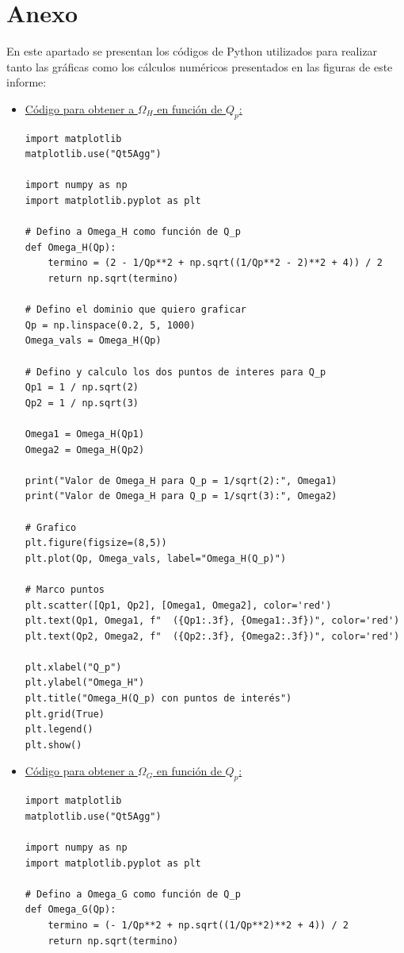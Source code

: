 \documentclass[12pt,a4paper]{article}
\begin{document}
\section{Anexo}
En este apartado se presentan los códigos de Python utilizados para realizar tanto las gráficas como los cálculos numéricos presentados en las figuras de este informe:

\begin{itemize}

\item \underline{Código para obtener a $\Omega_H$ en función de $Q_p$:}
\begin{verbatim}
import matplotlib
matplotlib.use("Qt5Agg")
    
import numpy as np
import matplotlib.pyplot as plt
    
# Defino a Omega_H como función de Q_p
def Omega_H(Qp):
    termino = (2 - 1/Qp**2 + np.sqrt((1/Qp**2 - 2)**2 + 4)) / 2
    return np.sqrt(termino)
    
# Defino el dominio que quiero graficar
Qp = np.linspace(0.2, 5, 1000)
Omega_vals = Omega_H(Qp)
    
# Defino y calculo los dos puntos de interes para Q_p
Qp1 = 1 / np.sqrt(2)
Qp2 = 1 / np.sqrt(3)
    
Omega1 = Omega_H(Qp1)
Omega2 = Omega_H(Qp2)
    
print("Valor de Omega_H para Q_p = 1/sqrt(2):", Omega1)
print("Valor de Omega_H para Q_p = 1/sqrt(3):", Omega2)
    
# Grafico
plt.figure(figsize=(8,5))
plt.plot(Qp, Omega_vals, label="Omega_H(Q_p)")
    
# Marco puntos
plt.scatter([Qp1, Qp2], [Omega1, Omega2], color='red')
plt.text(Qp1, Omega1, f"  ({Qp1:.3f}, {Omega1:.3f})", color='red')
plt.text(Qp2, Omega2, f"  ({Qp2:.3f}, {Omega2:.3f})", color='red')
    
plt.xlabel("Q_p")
plt.ylabel("Omega_H")
plt.title("Omega_H(Q_p) con puntos de interés")
plt.grid(True)
plt.legend()
plt.show()
\end{verbatim}

\item \underline{Código para obtener a $\Omega_G$ en función de $Q_p$:}
\begin{verbatim}
import matplotlib
matplotlib.use("Qt5Agg")
        
import numpy as np
import matplotlib.pyplot as plt
        
# Defino a Omega_G como función de Q_p
def Omega_G(Qp):
    termino = (- 1/Qp**2 + np.sqrt((1/Qp**2)**2 + 4)) / 2
    return np.sqrt(termino)
        

\end{verbatim}
\end{itemize}
\end{document}

